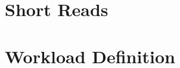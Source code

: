 \section{Short Reads}
\label{sec:interactive-short-reads}




\section{Workload Definition}
\label{sec:interactive-workload-definition}


